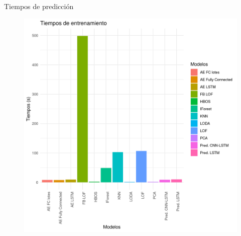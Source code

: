 \documentclass[10pt]{beamer}
\begin{document}
\begin{frame}[fragile]{Tiempos de predicción}
	\vspace{10px}
	\pause
	
	\begin{figure}[H]
		\centering
		\includegraphics[scale=0.43]{Imagenes/tiempos_prediccion.png}
	\end{figure}
	
\end{frame}
\end{document}
